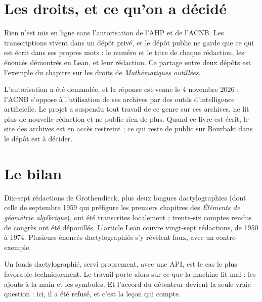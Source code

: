 \section{Les droits, et ce qu'on a décidé}

Rien n'est mis en ligne sans l'autorisation de l'AHP et de l'ACNB. Les transcriptions
vivent dans un dépôt privé, et le dépôt public ne garde que ce qui est écrit dans ses propres
mots : le numéro et le titre de chaque rédaction, les énoncés démontrés en Lean, et leur
rédaction. Ce partage entre deux dépôts est l'exemple du chapitre sur les droits de
\emph{Mathématiques outillées}.

L'autorisation a été demandée, et la réponse est venue le 4 novembre 2026 : l'ACNB s'oppose
à l'utilisation de ses archives par des outils d'intelligence artificielle. Le projet a
suspendu tout travail de ce genre sur ces archives, ne lit plus de nouvelle rédaction et ne publie rien de plus.
Quand ce livre est écrit, le site des archives est en accès restreint ; ce qui reste de
public sur Bourbaki dans le dépôt est à décider.

\section{Le bilan}

Dix-sept rédactions de Grothendieck, plus deux longues dactylographies (dont celle de
septembre 1959 qui préfigure les premiers chapitres des \emph{Éléments de géométrie
algébrique}), ont été transcrites localement ; trente-six comptes rendus de congrès ont
été dépouillés. L'article Lean couvre vingt-sept rédactions, de 1950 à 1974. Plusieurs
énoncés dactylographiés s'y révèlent faux, avec un contre-exemple.

\begin{exemple}
Un fonds dactylographié, servi proprement, avec une API, est le cas le plus favorable
techniquement. Le travail porte alors sur ce que la machine lit mal : les ajouts à la main
et les symboles. Et l'accord du détenteur devient la seule vraie question : ici, il a été
refusé, et c'est la leçon qui compte.
\end{exemple}
